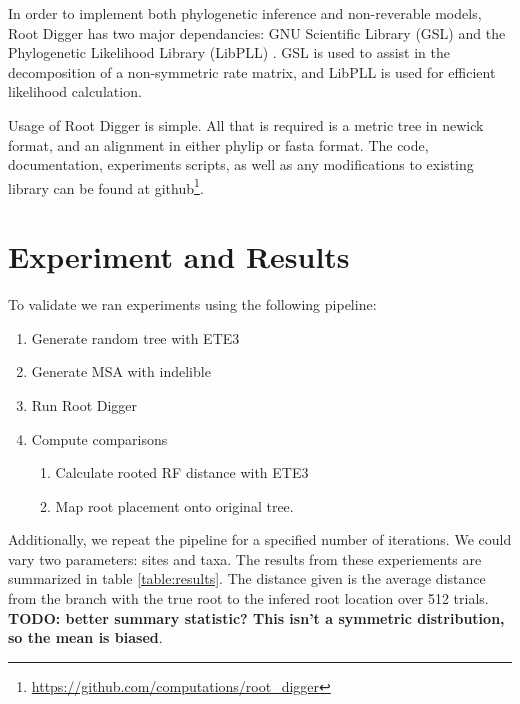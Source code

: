 \documentclass{article}
\begin{document}
In order to implement both phylogenetic inference and non-reverable models, Root
Digger has two major dependancies: GNU Scientific Library (GSL)
\cite{gough_gnu_2009} and the Phylogenetic Likelihood Library (LibPLL)
\cite{flouri_phylogenetic_2015}. GSL is used to assist in the decomposition of
a non-symmetric rate matrix, and LibPLL is used for efficient likelihood
calculation.

Usage of Root Digger is simple. All that is required is a metric tree in newick
format, and an alignment in either phylip or fasta format.  The code,
documentation, experiments scripts, as well as any modifications to existing
library can be found at
github\footnote{\url{https://github.com/computations/root_digger}}.

\section{Experiment and Results}

To validate we ran experiments using the following pipeline:

\begin{enumerate}
\item Generate random tree with ETE3 \cite{huerta-cepas_ete_2016}
\item Generate MSA with indelible \cite{fletcher_indelible:_2009}
\item Run Root Digger
\item Compute comparisons
\begin{enumerate}
  \item Calculate rooted RF distance with ETE3 \cite{robinson_comparison_1981}
  \item Map root placement onto original tree.
\end{enumerate}

\end{enumerate}

Additionally, we repeat the pipeline for a specified number of iterations. We
could vary two parameters: sites and taxa. The results from these experiements
are summarized in table \ref{table:results}. The distance given is the average
distance from the branch with the true root to the infered root location over
512 trials. {\bf TODO: better summary statistic? This isn't a symmetric
distribution, so the mean is biased}.

\begin{table}
\begin{center}
  
  \label{table:results}
\end{center}
\end{table}
\end{document}
